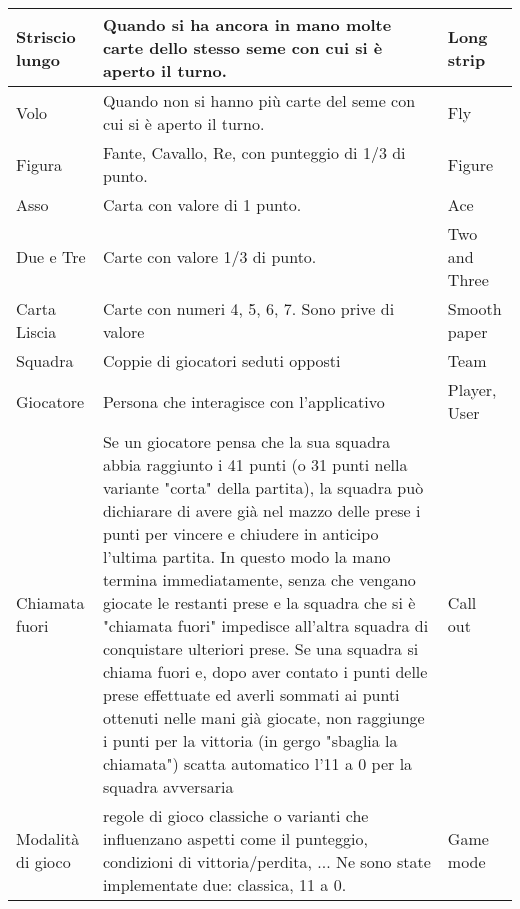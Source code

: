 \begin{table}[!ht]
\begin{adjustbox}{max width=1.1\textwidth,center}
\begin{tabular}{|l|p{10cm}|l|}
        Striscio lungo & Quando si ha ancora in mano molte carte dello stesso seme con cui si è aperto il turno. & Long strip \\ \hline
        Volo & Quando non si hanno più carte del seme con cui si è aperto il turno. & Fly \\ \hline
        Figura & Fante, Cavallo, Re, con punteggio di 1/3 di punto. & Figure \\ \hline
        Asso & Carta con valore di 1 punto. & Ace \\ \hline
        Due e Tre & Carte con valore 1/3 di punto. & Two and Three \\ \hline
        Carta Liscia & Carte con numeri 4, 5, 6, 7. Sono prive di valore & Smooth paper \\ \hline
        Squadra & Coppie di giocatori seduti opposti & Team \\ \hline
        Giocatore & Persona che interagisce con l’applicativo & Player, User \\ \hline
        Chiamata fuori & Se un giocatore pensa che la sua squadra abbia raggiunto i 41 punti (o 31 punti nella variante "corta" della partita), la squadra può  dichiarare di avere già nel mazzo delle prese i punti per vincere e chiudere in anticipo l'ultima partita. In questo modo la mano termina immediatamente, senza che vengano giocate le restanti prese e la squadra che si è "chiamata fuori" impedisce all'altra squadra di conquistare ulteriori prese. Se una squadra si chiama fuori e, dopo aver contato i punti delle prese effettuate ed averli sommati ai punti ottenuti nelle mani già giocate, non raggiunge i punti per la vittoria (in gergo "sbaglia la chiamata") scatta automatico l'11 a 0 per la squadra avversaria & Call out \\ \hline
        Modalità di gioco & regole di gioco classiche o varianti che influenzano aspetti come il punteggio, condizioni di vittoria/perdita, ... Ne sono state implementate due: classica, 11 a 0.& Game mode \\ \hline
    \end{tabular}
    \end{adjustbox}
\end{table}
\newpage